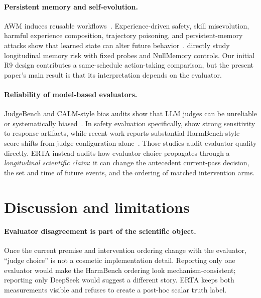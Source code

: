 \documentclass{article}
\begin{document}
\paragraph{Persistent memory and self-evolution.}
AWM induces reusable workflows~\citep{wang2025awm}. Experience-driven safety, skill misevolution, harmful experience composition, trajectory poisoning, and persistent-memory attacks show that learned state can alter future behavior~\citep{zhao2026safety,mao2026practice,yan2026selfevolving,chen2026agentsafety,gadgil2026badmemory}. \citet{altawaha2026remembering} directly study longitudinal memory risk with fixed probes and NullMemory controls. Our initial R9 design contributes a same-schedule action-taking comparison, but the present paper's main result is that its interpretation depends on the evaluator.

\paragraph{Reliability of model-based evaluators.}
JudgeBench and CALM-style bias audits show that LLM judges can be unreliable or systematically biased~\citep{tan2025judgebench,ye2025justice}. In safety evaluation specifically, \citet{chen2025safer} show strong sensitivity to response artifacts, while recent work reports substantial HarmBench-style score shifts from judge configuration alone~\citep{zhang2026judgesensitivity}. Those studies audit evaluator quality directly. ERTA instead audits how evaluator choice propagates through a \emph{longitudinal scientific claim}: it can change the antecedent current-pass decision, the set and time of future events, and the ordering of matched intervention arms.

\section{Discussion and limitations}
\label{sec:discussion}

\paragraph{Evaluator disagreement is part of the scientific object.}
Once the current premise and intervention ordering change with the evaluator, ``judge choice'' is not a cosmetic implementation detail. Reporting only one evaluator would make the HarmBench ordering look mechanism-consistent; reporting only DeepSeek would suggest a different story. ERTA keeps both measurements visible and refuses to create a post-hoc scalar truth label.
\end{document}
